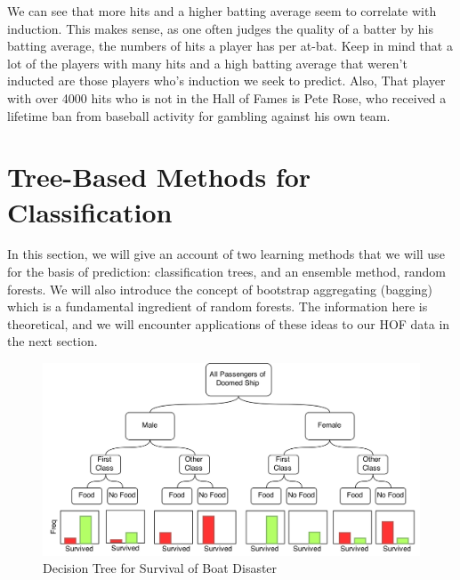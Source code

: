 \documentclass[preprint,12pt]{elsarticle}
\begin{document}
We can see that more hits and a higher batting average seem to correlate with induction. This makes sense, as one often judges the quality of a batter by his batting average, the numbers of hits a player has per at-bat. Keep in mind that a lot of the players with many hits and a high batting average that weren't inducted are those players who's induction we seek to predict. Also, That player with over 4000 hits who is not in the Hall of Fames is Pete Rose, who received a lifetime ban from baseball activity for gambling against his own team.







\section{Tree-Based Methods for Classification}

In this section, we will give an account of two learning methods that we will use for the basis of prediction: classification trees, and an ensemble method, random forests. We will also introduce the concept of bootstrap aggregating (bagging) which is a fundamental ingredient of random forests. The information here is theoretical, and we will encounter applications of these ideas to our HOF data in the next section.
\begin{figure}[h]
	\centering
	\includegraphics[width=1\textwidth]{TreeExample}
	\caption{Decision Tree for Survival of Boat Disaster}
	\label{fig:SampleTree}
\end{figure}
\end{document}

